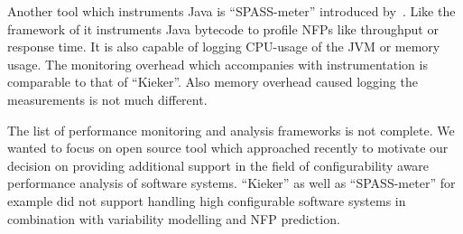 Another tool which instruments Java is ``SPASS-meter'' introduced by~\cite{eichelber12spassmeter}. Like the framework of \cite{vanHoorn2012kieker} it instruments Java bytecode to profile \acp{NFP} like throughput or response time. It is also capable of logging CPU-usage of the \ac{JVM} or memory usage. The monitoring overhead which accompanies with instrumentation is comparable to that of ``Kieker''. Also memory overhead caused logging the measurements is not much different. 

The list of performance monitoring and analysis frameworks is not complete. We wanted to focus on open source tool which approached recently to motivate our decision on providing additional support in the field of configurability aware performance analysis of software systems. ``Kieker'' as well as ``SPASS-meter'' for example did not support handling high configurable software systems in combination with variability modelling and \ac{NFP} prediction.